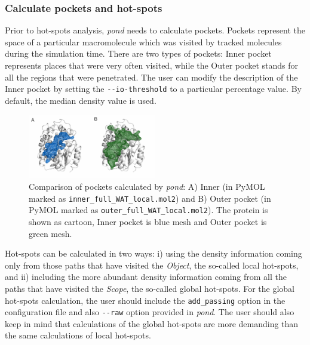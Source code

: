 \documentclass[9pt,tutorial]{livecoms}
\begin{document}
\subsubsection{Calculate pockets and hot-spots}
Prior to hot-spots analysis, \emph{pond} needs to calculate pockets. Pockets represent the space of a particular macromolecule which was visited by tracked molecules during the simulation time. There are two types of pockets: Inner pocket represents places that were very often visited, while the Outer pocket stands for all the regions that were  penetrated. The user can modify the description of the Inner pocket by setting the \texttt{-{}-io-threshold} to a particular percentage value. By default, the median density value is used.

\begin{figure}[ht!]
\centering
\includegraphics[width=0.5\textwidth]{Tut4.2.png}
\caption{Comparison of pockets calculated by \textit{pond}: A) Inner (in PyMOL marked as \texttt{inner\_full\_WAT\_local.mol2}) and B) Outer pocket (in PyMOL marked as \texttt{outer\_full\_WAT\_local.mol2}). The protein is shown as cartoon, Inner pocket is blue mesh and Outer pocket is green mesh.}
\label{Tut4.2}
\end{figure}

Hot-spots can be calculated in two ways: i) using the density information coming only from those paths that have visited the \emph{Object}, the so-called local hot-spots, and ii) including the more abundant density information coming from all the paths that have visited the \emph{Scope}, the so-called global hot-spots. For the global hot-spots calculation, the user should include the \texttt{add\_passing} option in the configuration file and also \texttt{-{}-raw} option provided in \emph{pond}. The user should also keep in mind that calculations of the global hot-spots are more demanding than the same calculations of local hot-spots.
\end{document}
